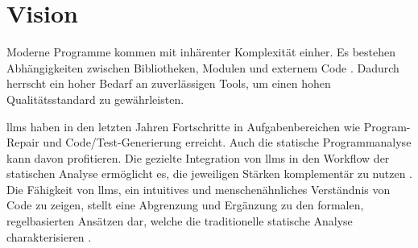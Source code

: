 \section{Vision} 


Moderne Programme kommen mit inhärenter Komplexität einher. Es bestehen Abhängigkeiten zwischen Bibliotheken, Modulen und externem Code \cite{khareUnderstandingEffectivenessLarge2024}. Dadurch herrscht ein hoher Bedarf an zuverlässigen Tools, um einen hohen Qualitätsstandard zu gewährleisten.

\acp{llm} haben in den letzten Jahren Fortschritte in Aufgabenbereichen wie Program-Repair \cite{xiaAutomatedProgramRepair2023} und Code/Test-Generierung \cite{lemieuxCodaMosaEscapingCoverage2023} erreicht. Auch die statische Programmanalyse kann davon profitieren. Die gezielte Integration von \acp{llm} in den Workflow der statischen Analyse ermöglicht es, die jeweiligen Stärken komplementär zu nutzen \cite{liEnhancingStaticAnalysis2024}\cite{wagnerEffectiveComplementarySecurity2025}.
Die Fähigkeit von \acp{llm}, ein intuitives und menschenähnliches Verständnis von Code zu zeigen, stellt eine Abgrenzung und Ergänzung zu den formalen, regelbasierten Ansätzen dar, welche die traditionelle statische Analyse charakterisieren \cite{liEnhancingStaticAnalysis2024}.

